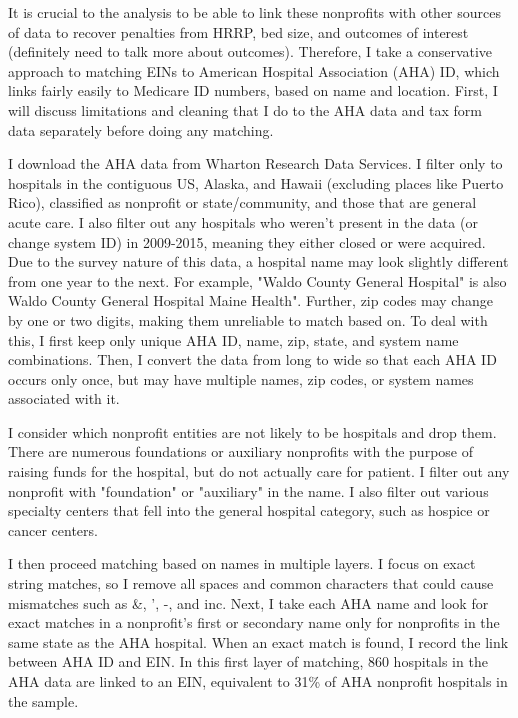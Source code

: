 \documentclass[12pt]{article}
\begin{document}
It is crucial to the analysis to be able to link these nonprofits with other sources of data to recover penalties from HRRP, bed size, and outcomes of interest (definitely need to talk more about outcomes). Therefore, I take a conservative approach to matching EINs to American Hospital Association (AHA) ID, which links fairly easily to Medicare ID numbers, based on name and location. First, I will discuss limitations and cleaning that I do to the AHA data and tax form data separately before doing any matching. 

I download the AHA data from Wharton Research Data Services. I filter only to hospitals in the contiguous US, Alaska, and Hawaii (excluding places like Puerto Rico), classified as nonprofit or state/community, and those that are general acute care. I also filter out any hospitals who weren't present in the data (or change system ID) in 2009-2015, meaning they either closed or were acquired. Due to the survey nature of this data, a hospital name may look slightly different from one year to the next. For example, "Waldo County General Hospital" is also Waldo County General Hospital Maine Health". Further, zip codes may change by one or two digits, making them unreliable to match based on. To deal with this, I first keep only unique AHA ID, name, zip, state, and system name combinations. Then, I convert the data from long to wide so that each AHA ID occurs only once, but may have multiple names, zip codes, or system names associated with it.

I consider which nonprofit entities are not likely to be hospitals and drop them. There are numerous foundations or auxiliary nonprofits with the purpose of raising funds for the hospital, but do not actually care for patient. I filter out any nonprofit with "foundation" or "auxiliary" in the name. I also filter out various specialty centers that fell into the general hospital category, such as hospice or cancer centers. 

I then proceed matching based on names in multiple layers. I focus on exact string matches, so I remove all spaces and common characters that could cause mismatches such as \&, ', -, and inc. Next, I take each AHA name and look for exact matches in a nonprofit's first or secondary name only for nonprofits in the same state as the AHA hospital. When an exact match is found, I record the link between AHA ID and EIN. In this first layer of matching, 860 hospitals in the AHA data are linked to an EIN, equivalent to 31\% of AHA nonprofit hospitals in the sample. 
\end{document}
